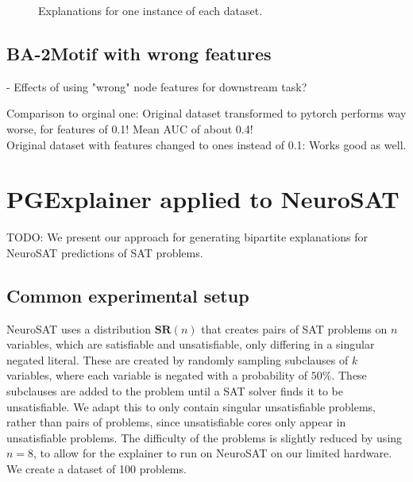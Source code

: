 \begin{figure}[h]
    \caption{Explanations for one instance of each dataset.}
    \label{fig:qual_expl}
\end{figure}





\subsection{BA-2Motif with wrong features}
- Effects of using "wrong" node features for downstream task?

Comparison to orginal one: Original dataset transformed to pytorch performs way worse, for features of 0.1! Mean AUC of about 0.4! \\
Original dataset with features changed to ones instead of 0.1: Works good as well.



\section{PGExplainer applied to NeuroSAT}
\label{sec:SAT-experiments}

TODO: We present our approach for generating bipartite explanations for NeuroSAT \cite{} predictions of SAT problems.

\subsection{Common experimental setup}

NeuroSAT \cite{selsam2018learning} uses a distribution $\textbf{SR}(n)$ that creates pairs of SAT problems on $n$ variables, which are satisfiable and unsatisfiable, only differing in a singular negated literal. These are created by randomly sampling subclauses of $k$ variables, where each variable is negated with a probability of $50\%$. These subclauses are added to the problem until a SAT solver \cite{een2003extensible} finds it to be unsatisfiable. We adapt this to only contain singular unsatisfiable problems, rather than pairs of problems, since unsatisfiable cores only appear in unsatisfiable problems. The difficulty of the problems is slightly reduced by using $n=8$, to allow for the explainer to run on NeuroSAT on our limited hardware. We create a dataset of 100 problems.

